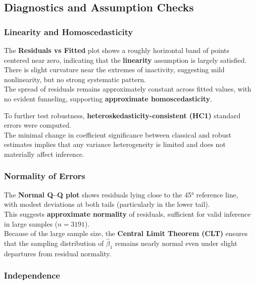 \documentclass[
  letterpaper,
  DIV=11,
  numbers=noendperiod]{scrartcl}
\begin{document}
\subsection{Diagnostics and Assumption
Checks}\label{diagnostics-and-assumption-checks}

\subsubsection{Linearity and
Homoscedasticity}\label{linearity-and-homoscedasticity}

The \textbf{Residuals vs Fitted} plot shows a roughly horizontal band of
points centered near zero, indicating that the \textbf{linearity}
assumption is largely satisfied.\\
There is slight curvature near the extremes of inactivity, suggesting
mild nonlinearity, but no strong systematic pattern.\\
The spread of residuals remains approximately constant across fitted
values, with no evident funneling, supporting \textbf{approximate
homoscedasticity}.

To further test robustness, \textbf{heteroskedasticity-consistent (HC1)}
standard errors were computed.\\
The minimal change in coefficient significance between classical and
robust estimates implies that any variance heterogeneity is limited and
does not materially affect inference.

\subsubsection{Normality of Errors}\label{normality-of-errors}

The \textbf{Normal Q--Q plot} shows residuals lying close to the 45°
reference line, with modest deviations at both tails (particularly in
the lower tail).\\
This suggests \textbf{approximate normality} of residuals, sufficient
for valid inference in large samples (\(n = 3191\)).\\
Because of the large sample size, the \textbf{Central Limit Theorem
(CLT)} ensures that the sampling distribution of \(\hat{\beta}_1\)
remains nearly normal even under slight departures from residual
normality.

\subsubsection{Independence}\label{independence}
\end{document}
